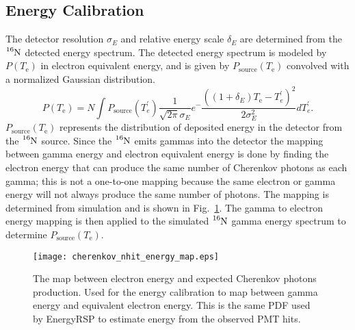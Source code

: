 \subsection{Energy Calibration}
The detector resolution $\sigma_{E}$ and relative energy scale $\delta_{E}$ are determined
from the $\ce{^{16}N}$ detected energy spectrum.
The detected energy spectrum is modeled by $P(T_\mathrm{e})$ in electron equivalent
energy, and is given by $P_{\mathrm{source}}(T_{\mathrm{e}})$
convolved with a normalized Gaussian distribution.
\begin{equation}
    P(T_\mathrm{e}) = N \int P_\mathrm{source}(T^{\prime}_{e})\frac{1}{\sqrt{2\pi}\sigma_{E}}e^-{\frac{\left((1+\delta_E)T_\mathrm{e}-T^{\prime}_{e}\right)^{2}}{2\sigma^{2}_{E}}}dT^{\prime}_{e}\text{.}%
\label{eq:convolution}
\end{equation}
$P_\mathrm{source}(T_{\mathrm{e}})$ represents the distribution of deposited energy in
the detector from the $\ce{^{16}N}$ source.
Since the $\ce{^{16}N}$ emits gammas into the detector the mapping between
gamma energy and electron equivalent energy is done by finding the electron
energy that can produce the same number of Cherenkov photons
as each gamma; this is not a one-to-one mapping because the same electron or gamma
energy will not always produce the same number of photons.
The mapping is determined from simulation and is shown in
Fig.~\ref{fig:cherenkov_energy_map}.
The gamma to electron energy mapping is then applied to the simulated $\ce{^{16}N}$
gamma energy spectrum to determine $P_\mathrm{source}(T_{\mathrm{e}})$.

\begin{figure}[htbp]
\centering
\texttt{[image: cherenkov\_nhit\_energy\_map.eps]}
\caption[Electron Cherenkov Photon Product PDF]{ The map between electron
energy and expected Cherenkov photons production.  Used for the energy
calibration to map between gamma energy and equivalent electron energy.  This is
the same PDF used by EnergyRSP to estimate energy from the observed PMT hits.}
\label{fig:cherenkov_energy_map}
\end{figure}

